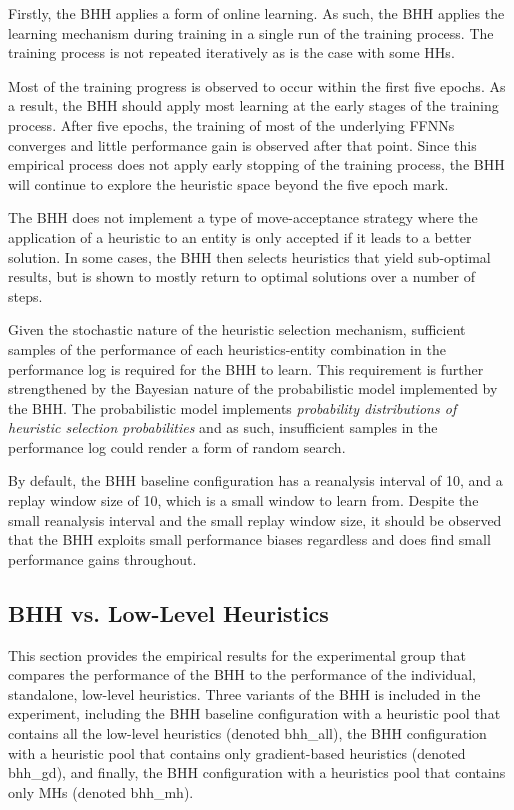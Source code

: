 \documentclass[preprint,review,12pt]{elsarticle}
\begin{document}
Firstly, the \acs{BHH} applies a form of online learning. As such, the \acs{BHH} applies the learning mechanism during training in a single run of the training process. The training process is not repeated iteratively as is the case with some \acp{HH}.

Most of the training progress is observed to occur within the first five epochs. As a result, the \acs{BHH} should apply most learning at the early stages of the training process. After five epochs, the training of most of the underlying \acp{FFNN} converges and little performance gain is observed after that point. Since this empirical process does not apply early stopping of the training process, the \acs{BHH} will continue to explore the heuristic space beyond the five epoch mark.

The \acs{BHH} does not implement a type of move-acceptance strategy where the application of a heuristic to an entity is only accepted if it leads to a better solution. In some cases, the \acs{BHH} then selects heuristics that yield sub-optimal results, but is shown to mostly return to optimal solutions over a number of steps.

Given the stochastic nature of the heuristic selection mechanism, sufficient samples of the performance of each heuristics-entity combination in the performance log is required for the \acs{BHH} to learn. This requirement is further strengthened by the Bayesian nature of the probabilistic model implemented by the \acs{BHH}. The probabilistic model implements \textit{probability distributions of heuristic selection probabilities} and as such, insufficient samples in the performance log could render a form of random search.

By default, the \acs{BHH} baseline configuration has a reanalysis interval of 10, and a replay window size of 10, which is a small window to learn from. Despite the small reanalysis interval and the small replay window size, it should be observed that the \acs{BHH} exploits small performance biases regardless and does find small performance gains throughout.

\subsection{BHH vs. Low-Level Heuristics}\label{sec:results:standalone}

This section provides the empirical results for the experimental group that compares the performance of the \acs{BHH} to the performance of the individual, standalone, low-level heuristics. Three variants of the \acs{BHH} is included in the experiment, including the \acs{BHH} baseline configuration with a heuristic pool that contains all the low-level heuristics (denoted bhh\_all), the \acs{BHH} configuration with a heuristic pool that contains only gradient-based heuristics (denoted bhh\_gd), and finally, the \acs{BHH} configuration with a heuristics pool that contains only \acp{MH} (denoted bhh\_mh).
\end{document}

